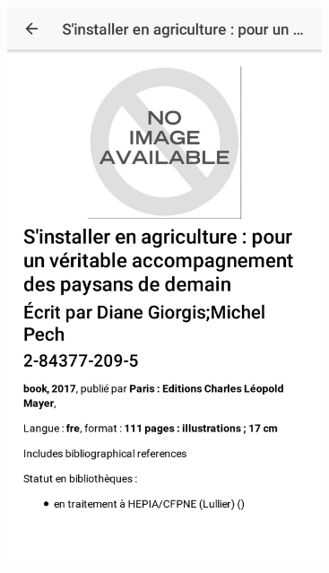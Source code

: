 \documentclass[10pt]{beamer}
\begin{document}
\begin{frame}
\begin{columns}[T]
        \begin{column}{.3\textwidth}
            \begin{figure}
                \includegraphics[width=1\textwidth]{images/screenshots/android3.png}
            \end{figure}
        \end{column}
        \begin{column}{.3\textwidth}
            \begin{figure}

\end{figure}
\end{column}
\end{columns}
\end{frame}
\end{document}
